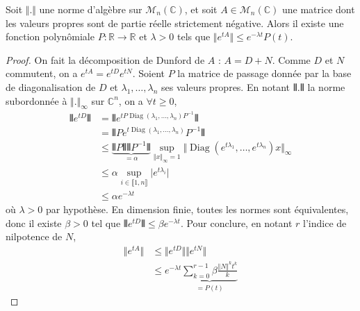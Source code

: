 



  
  
  
  \begin{lemma}
    \label{equation-de-sylvester-1}
    Soit $\Vert . \Vert$ une norme d'algèbre sur $\mathcal{M}_n(\mathbb{C})$, et soit $A \in \mathcal{M}_n(\mathbb{C})$ une matrice dont les valeurs propres sont de partie réelle strictement négative. Alors il existe une fonction polynômiale $P : \mathbb{R} \rightarrow \mathbb{R}$ et $\lambda > 0$ tels que $\Vert e^{tA} \Vert \leq e^{- \lambda t} P(t)$.
  \end{lemma}
  
  \begin{proof}
    On fait la décomposition de Dunford de $A$ : $A = D+N$. Comme $D$ et $N$ commutent, on a $e^{tA} = e^{tD} e^{tN}$. Soient $P$ la matrice de passage donnée par la base de diagonalisation de $D$ et $\lambda_1, \dots, \lambda_n$ ses valeurs propres. En notant $\VERT . \VERT$ la norme subordonnée à $\Vert . \Vert_\infty$ sur $\mathbb{C}^n$, on a $\forall t \geq 0$,
    \begin{align*}
      \VERT e^{tD} \VERT &= \VERT e^{tP \operatorname{Diag}(\lambda_1, \dots, \lambda_n) P^{-1}} \VERT \\
      & = \VERT P e^{t \operatorname{Diag}(\lambda_1, \dots, \lambda_n)} P^{-1} \VERT \\
      & \leq \underbrace{\VERT P \VERT \VERT P^{-1} \VERT}_{= \alpha} \sup_{\Vert x \Vert_\infty = 1} \Vert \operatorname{Diag}(e^{t \lambda_1}, \dots, e^{t \lambda_n}) x \Vert_{\infty} \\
      & \leq \alpha \sup_{i \in \llbracket 1, n \rrbracket} \vert e^{t\lambda_i} \vert \\
      & \leq \alpha e^{-\lambda t}
    \end{align*}
    où $\lambda > 0$ par hypothèse. En dimension finie, toutes les normes sont équivalentes, donc il existe $\beta > 0$ tel que $\VERT e^{tD} \VERT \leq \beta e^{- \lambda t}$.
    \newpar
    Pour conclure, en notant $r$ l'indice de nilpotence de $N$,
    \begin{align*}
      \Vert e^{tA} \Vert & \leq \Vert e^{tD} \Vert \Vert e^{tN} \Vert \\
      & \leq e^{- \lambda t} \underbrace{\sum_{k=0}^{r-1} \beta \frac{\Vert N \Vert^k t^k}{k}}_{= P(t)}
    \end{align*}
  \end{proof}
  
